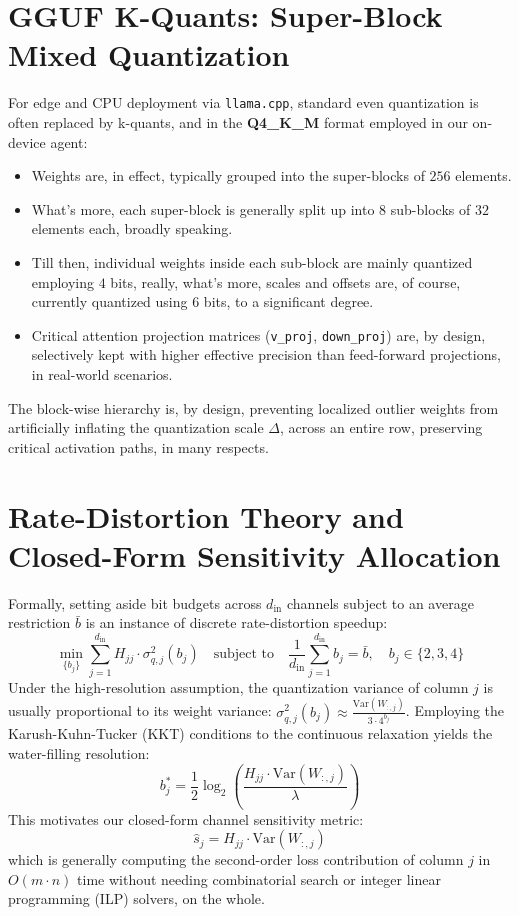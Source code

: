 \documentclass[12pt,a4paper,oneside]{report}
\begin{document}
    \section{GGUF K-Quants: Super-Block Mixed Quantization}
    For edge and CPU deployment via \texttt{llama.cpp}, standard even quantization is often replaced by k-quants, and in the \textbf{Q4\_K\_M} format employed in our on-device agent:
    \begin{itemize}
        \item Weights are, in effect, typically grouped into the super-blocks of $256$ elements.
        \item What's more, each super-block is generally split up into $8$ sub-blocks of $32$ elements each, broadly speaking.
        \item Till then, individual weights inside each sub-block are mainly quantized employing $4$ bits, really, what's more, scales and offsets are, of course, currently quantized using $6$ bits, to a significant degree.
        \item Critical attention projection matrices (\texttt{v\_proj}, \texttt{down\_proj}) are, by design, selectively kept with higher effective precision than feed-forward projections, in real-world scenarios.
    \end{itemize}
    The block-wise hierarchy is, by design, preventing localized outlier weights from artificially inflating the quantization scale $\Delta$, across an entire row, preserving critical activation paths, in many respects.

    \section{Rate-Distortion Theory and Closed-Form Sensitivity Allocation}
    Formally, setting aside bit budgets across $d_{\text{in}}$ channels subject to an average restriction $\bar{b}$ is an instance of discrete rate-distortion speedup:
    \begin{equation}
        \min_{\{b_j\}} \sum_{j=1}^{d_{\text{in}}} H_{jj} \cdot \sigma^2_{q, j}(b_j) \quad \text{subject to} \quad \frac{1}{d_{\text{in}}} \sum_{j=1}^{d_{\text{in}}} b_j = \bar{b}, \quad b_j \in \{2, 3, 4\}
    \end{equation}
    Under the high-resolution assumption, the quantization variance of column $j$ is usually proportional to its weight variance: $\sigma^2_{q, j}(b_j) \approx \frac{\text{Var}(W_{:, j})}{3 \cdot 4^{b_j}}$. Employing the Karush-Kuhn-Tucker (KKT) conditions to the continuous relaxation yields the water-filling resolution:
    \begin{equation}
        b_j^* = \frac{1}{2} \log_2 \left( \frac{H_{jj} \cdot \text{Var}(W_{:, j})}{\lambda} \right)
    \end{equation}
    This motivates our closed-form channel sensitivity metric:
    \begin{equation}
        \hat{s}_j = H_{jj} \cdot \text{Var}(W_{:, j})
    \end{equation}
    which is generally computing the second-order loss contribution of column $j$ in $O(m \cdot n)$ time without needing combinatorial search or integer linear programming (ILP) solvers, on the whole.
\end{document}
